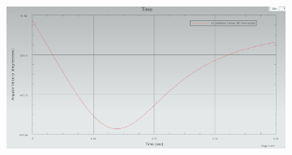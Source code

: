 \documentclass[12pt]{article}
\begin{document}
{\begin{figure}[H]
		\begin{subfigure}{0.8\textwidth}
			\centering\includegraphics[height=6cm,width=1\textwidth,keepaspectratio]{var3_2.jpeg}
			\caption{}
			\label{fig:var3_2.jpeg}
		\end{subfigure}
	\end{figure}
}
\end{document}
